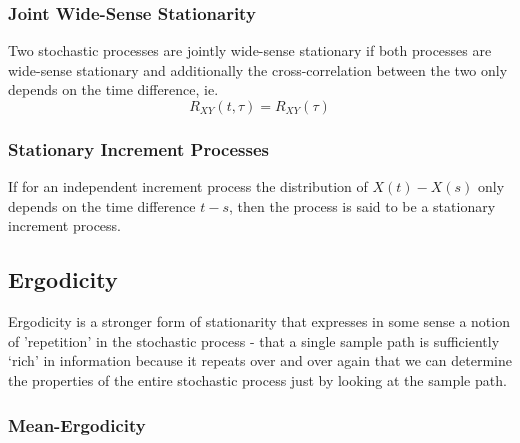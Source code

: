 \documentclass[11pt]{report} %
\begin{document}
\subsubsection{Joint Wide-Sense Stationarity}

Two stochastic processes are jointly wide-sense stationary if both processes are wide-sense stationary and additionally the cross-correlation between the two only depends on the time difference, ie.
\begin{equation}
R_{XY}\left(t, \tau\right) = R_{XY}\left(\tau\right)
\end{equation}

\subsubsection{Stationary Increment Processes}

If for an independent increment process the distribution of $X\left(t\right) - X\left(s\right)$ only depends on the time difference $t - s$, then the process is said to be a stationary increment process.

\subsection{Ergodicity}

Ergodicity is a stronger form of stationarity that expresses in some sense a notion of 'repetition' in the stochastic process - that a single sample path is sufficiently `rich' in information because it repeats over and over again that we can determine the properties of the entire stochastic process just by looking at the sample path.

\subsubsection{Mean-Ergodicity}
\end{document}
